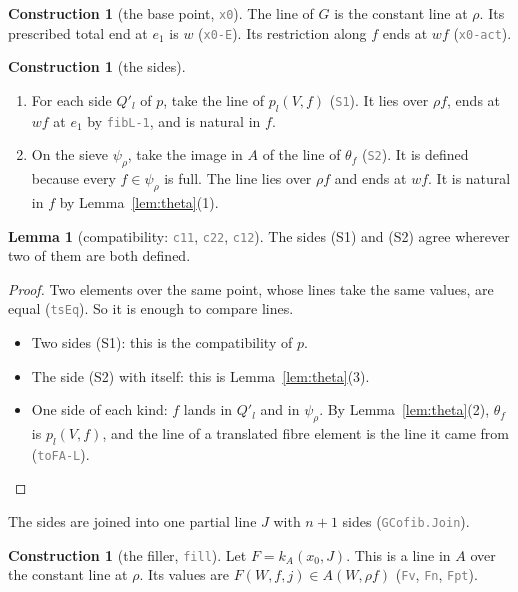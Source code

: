 \documentclass[11pt]{article}
\newcommand{\seg}[1]{\textcolor{gray}{\texttt{\small #1}}}
\theoremstyle{definition}
\newtheorem{lemma}[definition]{Lemma}
\newtheorem{construction}[definition]{Construction}
\theoremstyle{remark}
\begin{document}
\begin{construction}[the base point, \seg{x0}]
The line of $G$ is the constant line at $\rho$. Its prescribed total end at
$e_1$ is $w$ (\seg{x0-E}). Its restriction along $f$ ends at $wf$
(\seg{x0-act}).
\end{construction}

\begin{construction}[the sides]
\leavevmode
\begin{enumerate}
\item[(S1)] For each side $Q'_l$ of $p$, take the line of $p_l(V,f)$
  (\seg{S1}). It lies over $\rho f$, ends at $wf$ at $e_1$ by
  \seg{fibL-1}, and is natural in $f$.
\item[(S2)] On the sieve $\psi_\rho$, take the image in $A$ of the line
  of $\theta_f$ (\seg{S2}). It is defined because every $f\in\psi_\rho$ is
  full. The line lies over $\rho f$ and ends at $wf$. It is natural in $f$
  by Lemma~\ref{lem:theta}(1).
\end{enumerate}
\end{construction}

\begin{lemma}[compatibility: \seg{c11}, \seg{c22}, \seg{c12}]
The sides (S1) and (S2) agree wherever two of them are both defined.
\end{lemma}

\begin{proof}
Two elements over the same point, whose lines take the same values, are
equal (\seg{tsEq}). So it is enough to compare lines.
\begin{itemize}
\item Two sides (S1): this is the compatibility of $p$.
\item The side (S2) with itself: this is Lemma~\ref{lem:theta}(3).
\item One side of each kind: $f$ lands in $Q'_l$ and in $\psi_\rho$. By
  Lemma~\ref{lem:theta}(2), $\theta_f$ is $p_l(V,f)$, and the line of a
  translated fibre element is the line it came from (\seg{toFA-L}).
\end{itemize}
\end{proof}

The sides are joined into one partial line $J$ with $n+1$ sides
(\seg{GCofib.Join}).

\begin{construction}[the filler, \seg{fill}]
Let $F=k_A(x_0,J)$. This is a line in $A$ over the constant line at $\rho$.
Its values are $F(W,f,j)\in A(W,\rho f)$ (\seg{Fv}, \seg{Fn}, \seg{Fpt}).
\end{construction}
\end{document}
